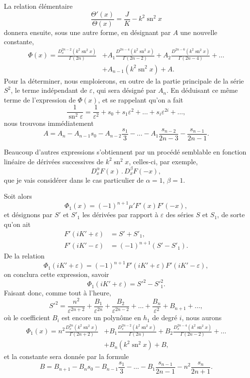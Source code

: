\documentclass[11pt,leqno,oneside,letterpaper]{book}[2005/09/16]
\DeclareMathOperator{\sn}{sn}
\newcommand{\cntrdot}{\mathbin{.}}
\begin{document}
La relation \'el\'ementaire
\[
\frac{\Theta'(x)}{\Theta(x)} = \frac{J}{K} - k^2 \sn^2 x
\]
donnera ensuite, sous une autre forme, en d\'esignant par $A$ une nouvelle
constante,
\begin{align*}
\Phi(x) =     \frac{D_x^{2n-2} (k^2 \sn^2 x)}{\Gamma(2n)}
    &+ A_1 \frac{D^{2n-4}   (k^2 \sn^2 x)}{\Gamma(2n-2)}
     + A_2 \frac{D^{2n-6}   (k^2 \sn^2 x)}{\Gamma(2n-4)} + \ldots\\
    &+ A_{n-1}              (k^2 \sn^2 x) + A.
\end{align*}
Pour la d\'eterminer, nous emploierons, en outre de la partie principale de
la s\'erie $S^2$, le terme ind\'ependant de $\varepsilon$, qui sera d\'esign\'e par $A_n$. En d\'eduisant
ce m\^eme terme de l'expression de $\Phi(x)$, et se rappelant qu'on a fait
\[
\frac{1}{\sn^2 \varepsilon} = \frac{1}{\varepsilon^2}
  + s_0 + s_1 \varepsilon^2 + \ldots + s_i \varepsilon^{2i} + \ldots,
\]
nous trouvons imm\'ediatement
\[
A = A_n - A_{n-1} s_0 - A_{n-2} \frac{s_1}{3} - \ldots
  - A_1\frac{s_{n-2}}{2n-3} - \frac{s_{n-1}}{2n - 1}.
\]

Beaucoup d'autres expressions s'obtiennent par un proc\'ed\'e semblable
en fonction lin\'eaire de d\'eriv\'ees successives de $k^2 \sn^2 x$, celles-ci, par exemple,
\[
D_x^{\alpha} F(x) \cntrdot D_x^{\beta} F(-x),
\]
que je vais consid\'erer dans le cas particulier de $\alpha = 1$, $\beta = 1$.

Soit alors
\[
\Phi_1(x) = (-1)^{n+1} \mu' F'(x) F'(-x),
\]
et d\'esignons par $S'$ et $S'_1$ les d\'eriv\'ees par rapport \`a $\varepsilon$ des s\'eries $S$ et $S_1$, de
sorte qu'on ait
\begin{align*}
F'(iK' + \varepsilon) &= S' + S'_1, \\
F'(iK' - \varepsilon) &= (-1)^{n+1}(S' - S'_1).
\end{align*}
De la relation
\[
\Phi_1(iK' + \varepsilon) = (-1)^{n+1} F'(iK' + \varepsilon) F'(iK' - \varepsilon),
\]
on conclura cette expression, savoir
\[
\Phi_1(iK' + \varepsilon) = S'^2 - S'^2_1.
\]
Faisant donc, comme tout \`a l'heure,
\[
S'^2 = \frac{n^2}{\varepsilon^{2n+2}} + \frac{B_1}{\varepsilon^{2n}}
     + \frac{B_2}{\varepsilon^{2n-2}} + \ldots + \frac{B_n}{\varepsilon^2}
     + B_{n+1} + \ldots,
\]
o\`u le coefficient $B_i$ est encore un polyn\^ome en $h_1$ de degr\'e $i$, nous aurons
\begin{align*}
\Phi_1(x) = n^2 \frac{D_x^{2n}  (k^2 \sn^2 x)}{\Gamma(2n + 2)}
& + B_1 \frac{D_x^{2n-2}(k^2 \sn^2 x)}{\Gamma(2n)}
  + B_2 \frac{D_x^{2n-4}  (k^2 \sn^2 x)}{\Gamma(2n - 2)} + \ldots\\
& + B_n                 (k^2 \sn^2 x) + B,
\end{align*}
et la constante sera donn\'ee par la formule
\[
B = B_{n+1} - B_n s_0 - B_{n-1} \frac{s_1}{3} - \ldots
  - B_1\frac{s_{n-1}}{2n-1} - n^2\frac{s_n}{2n+1}.
\]
\end{document}

